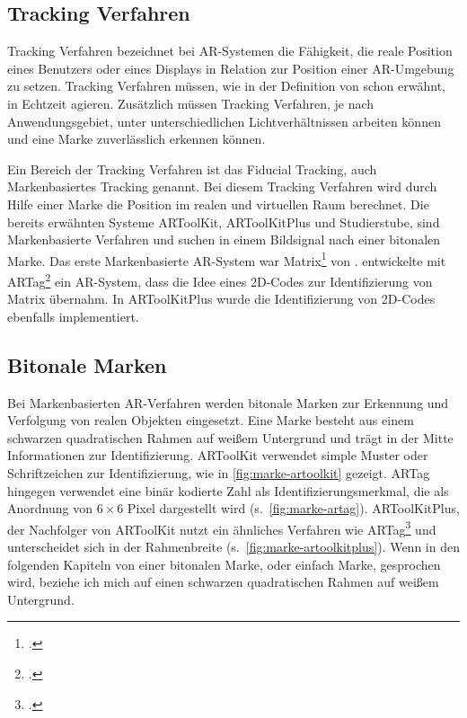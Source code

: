\subsection{Tracking Verfahren} %
\label{sec:tracking_verfahren}
Tracking Verfahren bezeichnet bei \gls{AR}-Systemen die Fähigkeit, die reale Position eines Benutzers oder eines
 Displays in Relation zur Position einer \gls{AR}-Umgebung zu setzen. Tracking Verfahren müssen, wie in der Definition
 von \citeauthor{azuma97} schon erwähnt, in Echtzeit agieren. Zusätzlich müssen Tracking Verfahren, je nach
 Anwendungsgebiet, unter unterschiedlichen Lichtverhältnissen arbeiten können und eine Marke zuverlässlich erkennen
 können.

Ein Bereich der Tracking Verfahren ist das Fiducial Tracking, auch Markenbasiertes Tracking genannt. Bei diesem
 Tracking Verfahren wird durch Hilfe einer Marke die Position im realen und virtuellen Raum berechnet. Die bereits
 erwähnten Systeme ARToolKit, ARToolKitPlus und Studierstube, sind Markenbasierte Verfahren und suchen in einem
 Bildsignal nach einer bitonalen Marke. Das erste Markenbasierte \gls{AR}-System war
 Matrix\footcite{rekimoto1998matrix} von \citeauthor{rekimoto1998matrix}. \citeauthor{fiala2004artaga} entwickelte mit
 ARTag\footcite{fiala2004artaga} ein \gls{AR}-System, dass die Idee eines 2D-Codes zur Identifizierung von Matrix
 übernahm. In ARToolKitPlus wurde die Identifizierung von 2D-Codes ebenfalls implementiert.

\subsection{Bitonale Marken} %
\label{sub:bitonalemarken}
Bei Markenbasierten \gls{AR}-Verfahren werden bitonale Marken zur Erkennung und Verfolgung von realen Objekten
 eingesetzt. Eine Marke besteht aus einem schwarzen quadratischen Rahmen auf weißem Untergrund und trägt in der Mitte
 Informationen zur Identifizierung. ARToolKit verwendet simple Muster oder Schriftzeichen zur Identifizierung, wie in
 \autoref{fig:marke-artoolkit} gezeigt. ARTag hingegen verwendet eine binär kodierte Zahl als Identifizierungsmerkmal,
 die als Anordnung von $6 \times 6$ Pixel dargestellt wird (s.~\autoref{fig:marke-artag}). ARToolKitPlus, der
 Nachfolger von ARToolKit nutzt ein ähnliches Verfahren wie ARTag\footcite[Vgl.][S.~142]{wagner07b} und unterscheidet
 sich in der Rahmenbreite (s.~\autoref{fig:marke-artoolkitplus}). Wenn in den folgenden Kapiteln von einer bitonalen
 Marke, oder einfach Marke, gesprochen wird, beziehe ich mich auf einen schwarzen quadratischen Rahmen auf weißem
 Untergrund.

